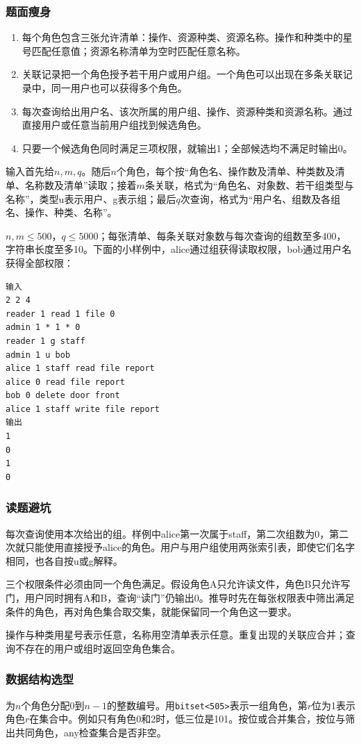 \subsubsection{题面瘦身}
\begin{enumerate}
\item 每个角色包含三张允许清单：操作、资源种类、资源名称。操作和种类中的星号匹配任意值；资源名称清单为空时匹配任意名称。
\item 关联记录把一个角色授予若干用户或用户组。一个角色可以出现在多条关联记录中，同一用户也可以获得多个角色。
\item 每次查询给出用户名、该次所属的用户组、操作、资源种类和资源名称。通过直接用户或任意当前用户组找到候选角色。
\item 只要一个候选角色同时满足三项权限，就输出1；全部候选均不满足时输出0。
\end{enumerate}
输入首先给$n,m,q$。随后$n$个角色，每个按“角色名、操作数及清单、种类数及清单、名称数及清单”读取；接着$m$条关联，格式为“角色名、对象数、若干组类型与名称”，类型u表示用户、g表示组；最后$q$次查询，格式为“用户名、组数及各组名、操作、种类、名称”。

$n,m\le500$，$q\le5000$；每张清单、每条关联对象数与每次查询的组数至多400，字符串长度至多10。下面的小样例中，alice通过组获得读取权限，bob通过用户名获得全部权限：
\begin{verbatim}
输入
2 2 4
reader 1 read 1 file 0
admin 1 * 1 * 0
reader 1 g staff
admin 1 u bob
alice 1 staff read file report
alice 0 read file report
bob 0 delete door front
alice 1 staff write file report
输出
1
0
1
0
\end{verbatim}

\subsubsection{读题避坑}
每次查询使用本次给出的组。样例中alice第一次属于staff，第二次组数为0，第二次就只能使用直接授予alice的角色。用户与用户组使用两张索引表，即使它们名字相同，也各自按u或g解释。

三个权限条件必须由同一个角色满足。假设角色A只允许读文件，角色B只允许写门，用户同时拥有A和B，查询“读门”仍输出0。推导时先在每张权限表中筛出满足条件的角色，再对角色集合取交集，就能保留同一个角色这一要求。

操作与种类用星号表示任意，名称用空清单表示任意。重复出现的关联应合并；查询不存在的用户或组时返回空角色集合。

\subsubsection{数据结构选型}
为$n$个角色分配0到$n-1$的整数编号。用\texttt{bitset<505>}表示一组角色，第$r$位为1表示角色$r$在集合中。例如只有角色0和2时，低三位是101。按位或合并集合，按位与筛出共同角色，any检查集合是否非空。


